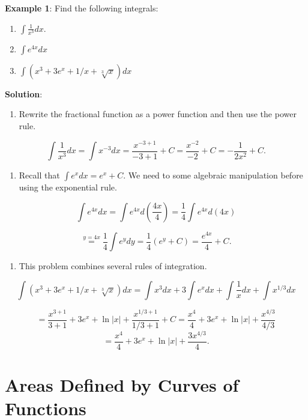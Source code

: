 \documentclass[
]{book}
\providecommand{\tightlist}{%
  \setlength{\itemsep}{0pt}\setlength{\parskip}{0pt}}
\begin{document}
\hfill\break

\textbf{Example 1}: Find the following integrals:

\begin{enumerate}
\def\labelenumi{\arabic{enumi}.}
\item
  \(\int \frac{1}{x^3}dx\).
\item
  \(\int e^{4x}dx\)
\item
  \(\int (x^3 + 3e^x + 1/x + \sqrt[3]{x})dx\)
\end{enumerate}

\textbf{Solution}:

\begin{enumerate}
\def\labelenumi{\arabic{enumi}.}
\tightlist
\item
  Rewrite the fractional function as a power function and then use the power rule.
\end{enumerate}

\[
\int \frac{1}{x^3} dx = \int x^{-3}dx = \frac{x^{-3 + 1}}{-3 + 1}+ C = \frac{x^{-2}}{-2} + C = -\frac{1}{2x^2} + C.
\]

\begin{enumerate}
\def\labelenumi{\arabic{enumi}.}
\setcounter{enumi}{1}
\tightlist
\item
  Recall that \(\int e^x dx = e^x + C\). We need to some algebraic manipulation before using the exponential rule.
\end{enumerate}

\[
\int e^{4x}dx = \int e^{4x} d\left(\frac{4x}{4} \right) = \frac{1}{4}\int e^{4x} d(4x) 
\]

\[
 \stackrel{y = 4x}{=} \frac{1}{4}  \int e^y dy = \frac{1}{4}(e^y + C) = \frac{e^{4x}}{4} + C.
\]

\begin{enumerate}
\def\labelenumi{\arabic{enumi}.}
\setcounter{enumi}{2}
\tightlist
\item
  This problem combines several rules of integration.
\end{enumerate}

\[
\int (x^3 + 3e^x + 1/x + \sqrt[3]{x})dx = \int x^3 dx + 3\int e^x dx + \int \frac{1}{x} dx + \int x^{1/3} dx
\]

\[
= \frac{x^{3+1}}{3+1} + 3e^x + \ln |x| + \frac{x^{1/3 + 1}}{1/3 + 1} + C = \frac{x^4}{4} + 3e^x + \ln|x| + \frac{x^{4/3}}{4/3}
\]
\[
= \frac{x^4}{4} + 3e^x + \ln|x| + \frac{3x^{4/3}}{4} .
\]

\hfill\break

\hypertarget{areas-defined-by-curves-of-functions}{%
\section{Areas Defined by Curves of Functions}\label{areas-defined-by-curves-of-functions}}
\end{document}

